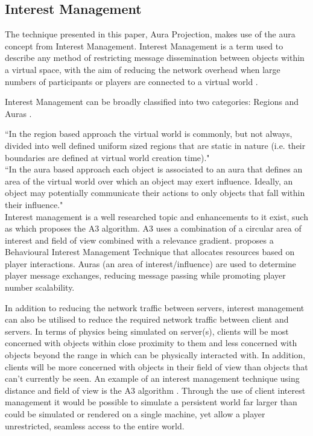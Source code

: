 \subsection{Interest Management}\label{InterestManagement}
The technique presented in this paper, Aura Projection, makes use of the aura concept from Interest Management. Interest Management is a term used to describe any method of restricting message dissemination between objects within a virtual space, with the aim of reducing the network overhead when large numbers of participants or players are connected to a virtual world \cite{Morgan2005}.

Interest Management can be broadly classified into two categories: Regions and Auras \cite{Morgan2005, storey2004determining}.

``In the region based approach the virtual world is commonly, but not always, divided into well defined uniform sized regions that are static in nature (i.e. their boundaries are defined at virtual world creation time)."\cite{storey2004determining}\\

``In the aura based approach each object is associated to an aura that defines an area of the virtual world over which an object may exert influence. Ideally, an object may potentially communicate their actions to only objects that fall within their influence."\cite{storey2004determining}\\

Interest management is a well researched topic and enhancements to it exist, such as \cite{Bezerra2008} which proposes the A3 algorithm. A3 uses a combination of a circular area of interest and field of view combined with a relevance gradient. \cite{LoadBalancingforMMOs} proposes a Behavioural Interest Management Technique that allocates resources based on player interactions. Auras (an area of interest/influence) are used to determine player message exchanges, reducing message passing while promoting player number scalability.

In addition to reducing the network traffic between servers, interest management can also be utilised to reduce the required network traffic between client and servers. In terms of physics being simulated on server(s), clients will be most concerned with objects within close proximity to them and less concerned with objects beyond the range in which can be physically interacted with. In addition, clients will be more concerned with objects in their field of view than objects that can't currently be seen. An example of an interest management technique using distance and field of view is the A3 algorithm \cite{Bezerra2008}. Through the use of client interest management it would be possible to simulate a persistent world far larger than could be simulated or rendered on a single machine, yet allow a player unrestricted, seamless access to the entire world.

